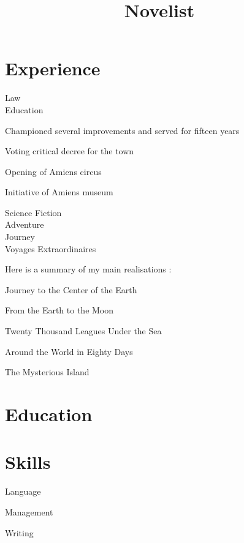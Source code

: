 \documentclass[a4paper,11pt]{cv4tw}%
\title{Novelist}
\begin{document}
\section{Experience}
{Law\\Education}
	{ Championed several improvements and served for fifteen years
	\begin{cvmissions}
		\item Voting critical decree for the town
		\item Opening of Amiens circus
		\item Initiative of Amiens museum
	\end{cvmissions}
}
	{Science Fiction\\Adventure\\Journey\\Voyages Extraordinaires}
	{Here is a summary of my main realisations :
	\begin{cvmissions}
		\item Journey to the Center of the Earth
		\item From the Earth to the Moon 
		\item Twenty Thousand Leagues Under the Sea
		\item Around the World in Eighty Days
		\item The Mysterious Island
	\end{cvmissions}
}
\section{Education}
\section{Skills}
\begin{cvskills} {Language}
\end{cvskills}
\begin{cvskills}{Management}
\end{cvskills}
\begin{cvskills}{Writing}
\end{cvskills}
\end{document}
